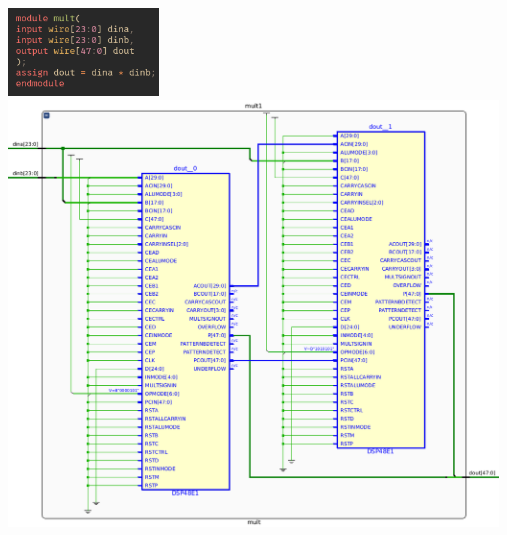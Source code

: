 {
    \centering
    \includegraphics[valign=c, width=4.0cm]{figures/mult_synthesis.png}
    \includegraphics[valign=c, width=13.0cm]{figures/dsp_synthesis.png}
    \label{mult_synthesis}
}
